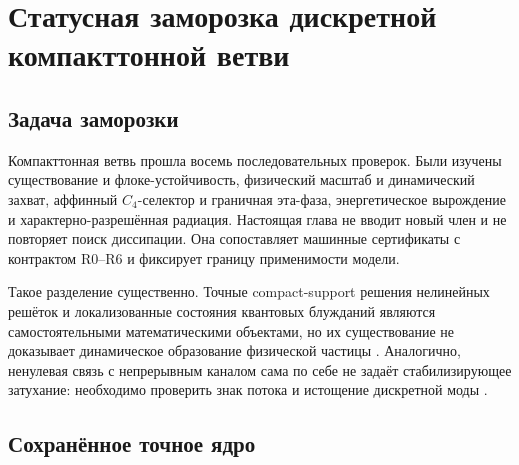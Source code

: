 \chapter{Статусная заморозка дискретной компакттонной ветви}
\label{ch:v6-spectral-transition-discrete-compacton-branch-status-freeze-gate}

\section{Задача заморозки}

Компакттонная ветвь прошла восемь последовательных проверок. Были изучены
существование и флоке-устойчивость, физический масштаб и динамический
захват, аффинный $C_4$-селектор и граничная эта-фаза, энергетическое
вырождение и характерно-разрешённая радиация. Настоящая глава не вводит
новый член и не повторяет поиск диссипации. Она сопоставляет машинные
сертификаты с контрактом R0--R6 и фиксирует границу применимости модели.

Такое разделение существенно. Точные compact-support решения нелинейных
решёток и локализованные состояния квантовых блужданий являются
самостоятельными математическими объектами, но их существование не
доказывает динамическое образование физической частицы
\cite{compacton-freeze-lee2016,compacton-freeze-bisio2021}. Аналогично,
ненулевая связь с непрерывным каналом сама по себе не задаёт
стабилизирующее затухание: необходимо проверить знак потока и истощение
дискретной моды \cite{compacton-freeze-fano1961}.

\section{Сохранённое точное ядро}

